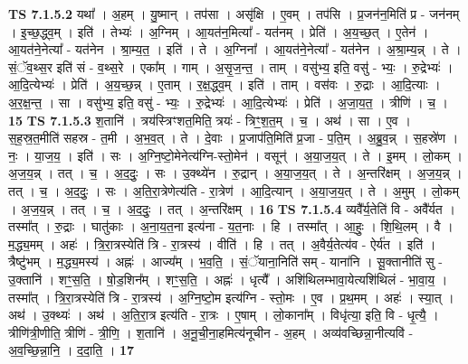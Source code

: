 \documentclass[17pt]{extarticle}
\begin{document}
                  \newline
                                \textbf{ TS 7.1.5.2} \newline
                  यथा᳚ । अ॒हम् । यु॒ष्मान् । तप॑सा । असृ॑क्षि । ए॒वम् । तप॑सि । प्र॒जन॑न॒मिति॑ प्र - जन॑नम् । इ॒च्छ॒द्ध्व॒म् । इति॑ । तेभ्यः॑ । अ॒ग्निम् । आ॒यत॑न॒मित्या᳚ - यत॑नम् । प्रेति॑ । अ॒य॒च्छ॒त् । ए॒तेन॑ । आ॒यत॑ने॒नेत्या᳚ - यत॑नेन । श्रा॒म्य॒त॒ । इति॑ । ते । अ॒ग्निना᳚ । आ॒यत॑ने॒नेत्या᳚ - यत॑नेन । अ॒श्रा॒म्य॒न्न् । ते । सं॒ॅव॒थ्स॒र इति॑ सं - व॒थ्स॒रे । एका᳚म् । गाम् । अ॒सृ॒ज॒न्त॒ । ताम् । वसु॑भ्य॒ इति॒ वसु॑ - भ्यः॒ । रु॒द्रेभ्यः॑ । आ॒दि॒त्येभ्यः॑ । प्रेति॑ । अ॒य॒च्छ॒न्न् । ए॒ताम् । र॒क्ष॒द्ध्व॒म् । इति॑ । ताम् । वस॑वः । रु॒द्राः । आ॒दि॒त्याः । अ॒र॒क्ष॒न्त॒ । सा । वसु॑भ्य॒ इति॒ वसु॑ - भ्यः॒ । रु॒द्रेभ्यः॑ । आ॒दि॒त्येभ्यः॑ । प्रेति॑ । अ॒जा॒य॒त॒ । त्रीणि॑ । च॒ । \textbf{  15} \newline
                  \newline
                                \textbf{ TS 7.1.5.3} \newline
                  श॒तानि॑ । त्रय॑स्त्रिꣳशत॒मिति॒ त्रयः॑ - त्रिꣳ॒॒श॒त॒म् । च॒ । अथ॑ । सा । ए॒व । स॒ह॒स्र॒त॒मीति॑ सहस्र - त॒मी । अ॒भ॒व॒त् । ते । दे॒वाः । प्र॒जाप॑ति॒मिति॑ प्र॒जा - प॒ति॒म् । अ॒ब्रु॒व॒न्न् । स॒हस्रे॑ण । नः॒ । या॒ज॒य॒ । इति॑ । सः । अ॒ग्नि॒ष्टो॒मेनेत्य॑ग्नि-स्तो॒मेन॑ । वसून्॑ । अ॒या॒ज॒य॒त् । ते । इ॒मम् । लो॒कम् । अ॒ज॒य॒न्न् । तत् । च॒ । अ॒द॒दुः॒ । सः । उ॒क्थ्ये॑न । रु॒द्रान् । अ॒या॒ज॒य॒त् । ते । अ॒न्तरि॑क्षम् । अ॒ज॒य॒न्न् । तत् । च॒ । अ॒द॒दुः॒ । सः । अ॒ति॒रा॒त्रेणेत्य॑ति - रा॒त्रेण॑ । आ॒दि॒त्यान् । अ॒या॒ज॒य॒त् । ते । अ॒मुम् । लो॒कम् । अ॒ज॒य॒न्न् । तत् । च॒ । अ॒द॒दुः॒ । तत् । अ॒न्तरि॑क्षम् । \textbf{  16} \newline
                  \newline
                                \textbf{ TS 7.1.5.4} \newline
                  व्यवै᳚र्य॒तेति॑ वि - अवै᳚र्यत । तस्मा᳚त् । रु॒द्राः । घातु॑काः । अ॒ना॒य॒त॒ना इत्य॑ना - य॒त॒नाः । हि । तस्मा᳚त् । आ॒हुः॒ । शि॒थि॒लम् । वै । म॒द्ध्य॒मम् । अहः॑ । त्रि॒रा॒त्रस्येति॑ त्रि - रा॒त्रस्य॑ । वीति॑ । हि । तत् । अ॒वैर्य॒तेत्य॑व - ऐर्य॑त । इति॑ । त्रैष्टु॑भम् । म॒द्ध्य॒मस्य॑ । अह्नः॑ । आज्य᳚म् । भ॒व॒ति॒ । सं॒ॅयाना॒निति॑ सम् - याना॑नि । सू॒क्तानीति॑ सु - उ॒क्तानि॑ । शꣳ॒॒स॒ति॒ । षो॒ड॒शिन᳚म् । शꣳ॒॒स॒ति॒ । अह्नः॑ । धृत्यै᳚ । अशि॑थिलम्भावा॒येत्यशि॑थिलं - भा॒वा॒य॒ । तस्मा᳚त् । त्रि॒रा॒त्रस्येति॑ त्रि - रा॒त्रस्य॑ । अ॒ग्नि॒ष्टो॒म इत्य॑ग्नि - स्तो॒मः । ए॒व । प्र॒थ॒मम् । अहः॑ । स्या॒त् । अथ॑ । उ॒क्थ्यः॑ । अथ॑ । अ॒ति॒रा॒त्र इत्य॑ति - रा॒त्रः । ए॒षाम् । लो॒काना᳚म् । विधृ॑त्या॒ इति॒ वि - धृ॒त्यै॒ । त्रीणि॑त्री॒णीति॒ त्रीणि॑ - त्री॒णि॒ । श॒तानि॑ । अ॒नू॒ची॒ना॒हमित्य॑नूचीन - अ॒हम् । अव्य॑वच्छिन्ना॒नीत्यवि॑ - अ॒व॒च्छि॒न्ना॒नि॒ । द॒दा॒ति॒ । \textbf{  17} \newline
\end{document}

